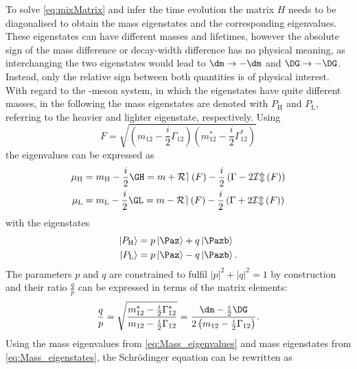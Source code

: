 To solve \cref{eq:mixMatrix} and infer the time evolution the matrix $H$ needs to be diagonalised to obtain the mass eigenstates and the corresponding eigenvalues.
These eigenstates can have different masses and lifetimes, however the absolute sign of the mass difference \dm or decay-width difference \DG has no physical meaning, as interchanging the two eigenstates would lead to $\dm\to-\dm$ and $\DG\to-\DG$.
Instead, only the relative sign between both quantities is of physical interest.
With regard to the \Bz-meson system, in which the eigenstates have quite different masses, in the following the mass eigenstates are denoted with $P_\text{H}$ and $P_\text{L}$, referring to the heavier and lighter eigenstate, respectively.
Using
\begin{equation}
F=\sqrt{\left(m_{12}-\frac{i}{2}\Gamma_{12}\right)\left(m_{12}^\ast-\frac{i}{2}\Gamma_{12}^\ast\right)}
\end{equation}
the eigenvalues can be expressed as
\begin{equation}
\begin{split}
\mu_\text{H} &= m_\text{H}-\frac{i}{2}\GH = m + \mathcal{Re}\left(F\right)-\frac{i}{2}\left(\Gamma-2\mathcal{Im}\left(F\right)\right)\\
\mu_\text{L} &= m_\text{L}-\frac{i}{2}\GL = m - \mathcal{Re}\left(F\right)-\frac{i}{2}\left(\Gamma+2\mathcal{Im}\left(F\right)\right)\label{eq:Mass_eigenvalues}
\end{split}
\end{equation}
with the eigenstates
\begin{equation}
\begin{split}
\left|P_\text{H}\right>&= p\left|\Paz\right>+q\left|\Pazb\right>\\
\left|P_\text{L}\right>&= p\left|\Paz\right>-q\left|\Pazb\right>.\label{eq:Mass_eigenstates}
\end{split}
\end{equation}
The parameters $p$ and $q$ are constrained to fulfil $\left|p\right|^2\!+\left|q\right|^2=1$ by construction and their ratio $\frac{q}{p}$ can be expressed in terms of the matrix elements:
\begin{equation}
\frac{q}{p}=\sqrt{ \frac{ m_{12}^\ast-\frac{i}{2}\Gamma_{12}^\ast }{ m_{12}-\frac{i}{2}\Gamma_{12} }}
=\frac{\dm-\frac{i}{2}\DG}{2\left(m_{12}-\frac{i}{2}\Gamma_{12}\right)}.\label{eq:qoverp}
\end{equation}
Using the mass eigenvalues from \cref{eq:Mass_eigenvalues} and mass eigenstates from \cref{eq:Mass_eigenstates}, the Schrödinger equation can be rewritten as
